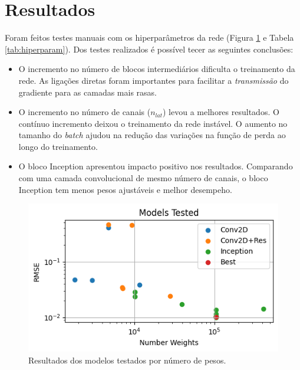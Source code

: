 \documentclass[final,5p]{elsarticle}
\numberwithin{equation}{section}
\begin{document}
\section{Resultados}

    Foram feitos testes manuais com os hiperparâmetros da rede (Figura \ref{fig:modelos} e Tabela \ref{tab:hiperparam}). Dos testes realizados é possível tecer as seguintes conclusões:

    \begin{itemize}
        \item O incremento no número de blocos intermediários dificulta o treinamento da rede. As ligações diretas foram importantes para facilitar a \emph{transmissão} do gradiente para as camadas mais rasas.
        \item O incremento no número de canais ($n_{lat}$) levou a melhores resultados. O contínuo incremento deixou o treinamento da rede instável. O aumento no tamanho do \emph{batch} ajudou na redução das variações na função de perda ao longo do treinamento.
        \item O bloco Inception apresentou impacto positivo nos resultados. Comparando com uma camada convolucional de mesmo número de canais, o bloco Inception tem menos pesos ajustáveis e melhor desempeho.
    \end{itemize}

    \begin{figure}[hbt!]
        \centering
        \includegraphics[width=0.95\columnwidth]{./fig/models.png}
        \caption{Resultados dos modelos testados por número de pesos.}\label{fig:modelos}
    \end{figure}
\end{document}
